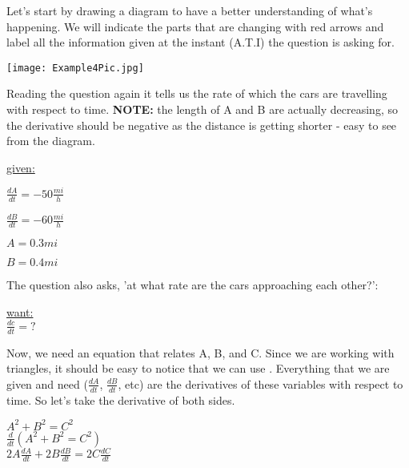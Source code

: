 \documentclass[12pt,fleqn]{book} %
\begin{document}
\vspace*{2mm}

\noindent Let's start by drawing a diagram to have a better understanding of what's happening. We will indicate the parts that are changing with red arrows and
label all the information given at the instant (A.T.I) the question is asking for.

\begin{center}
    \texttt{[image: Example4Pic.jpg]}
\end{center}

\noindent Reading the question again it tells us the rate of which the cars are travelling with respect to time. \textbf{NOTE:} the length of A and B are actually
decreasing, so the derivative should be negative as the distance is getting shorter - easy to see from the diagram.

\pagebreak

\begin{center}
    \underline{given:}
    \begin{multicols}{4}
        $\frac{dA}{dt}=-50 \frac{mi}{h}$

        $\frac{dB}{dt}=-60 \frac{mi}{h}$

        $A=0.3mi$

        $B=0.4mi$
    \end{multicols}
\end{center}

\noindent The question also asks, 'at what rate are the cars approaching each other?':

\begin{center}
    \underline{want:} \\
    $\frac{dc}{dt}=?$
\end{center}

\noindent Now, we need an equation that relates A, B, and C. Since we are working with triangles, it should be easy to notice that we can use .
Everything that we are given and need ($\frac{dA}{dt}$, $\frac{dB}{dt}$, etc) are the derivatives of these variables with respect to time. So let's take the derivative of both sides.

\begin{center}
    $A^2+B^2=C^2$ \\
    \vspace*{1mm}
    $\frac{d}{dt}(A^2+B^2=C^2)$ \\
    \vspace*{1mm}
    $2A\frac{dA}{dt}+2B\frac{dB}{dt}=2C\frac{dC}{dt}$
\end{center}
\end{document}
